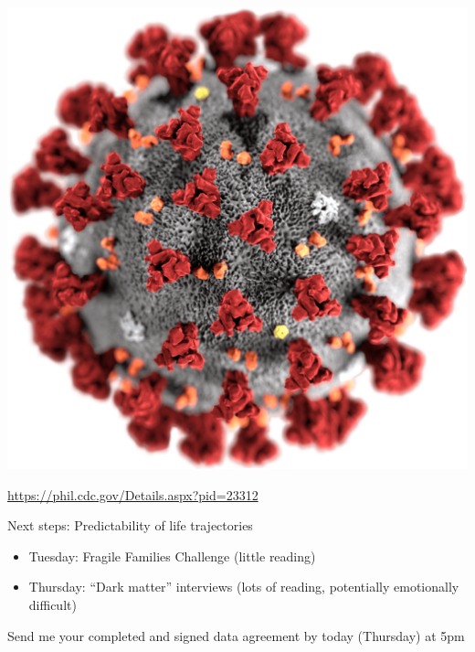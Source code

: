 \documentclass[aspectratio=169]{beamer}
\begin{document}
\begin{frame}

\begin{center}
\includegraphics[height = 0.9\textheight]{figures/covid}
\end{center}

\vfill
\tiny{\url{https://phil.cdc.gov/Details.aspx?pid=23312}}
\end{frame}
\begin{frame}

Next steps: Predictability of life trajectories
\begin{itemize}
\item Tuesday: Fragile Families Challenge (little reading)
\item Thursday: ``Dark matter'' interviews (lots of reading, potentially emotionally difficult)
\end{itemize}

Send me your completed and signed data agreement by today (Thursday) at 5pm

\end{frame}

\frame{\titlepage}
\end{document}

